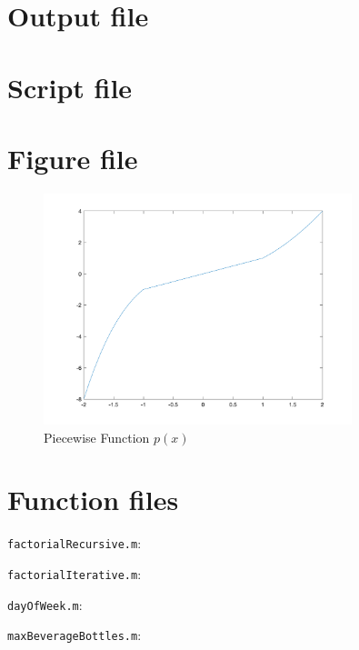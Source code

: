 \section{Output file}


\newpage
\section{Script file}

\newpage

\section{Figure file}
\begin{figure}[!hbtp]
    \centering
    \includegraphics[width=0.8\textwidth]{../src/lab_03_1d.png}
    \caption{Piecewise Function $p(x)$}
    \label{fig:piecewise}
\end{figure}

\newpage
\section{Function files}
\lstinline[style=Plain]{factorialRecursive.m}:

\lstinline[style=Plain]{factorialIterative.m}:

\lstinline[style=Plain]{dayOfWeek.m}:

\lstinline[style=Plain]{maxBeverageBottles.m}:

